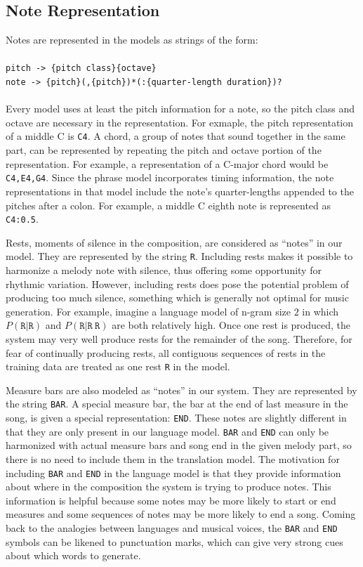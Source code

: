 \documentclass{sig-alternate}
\begin{document}
\subsection{Note Representation}
Notes are represented in the models as strings of the form:\\
\\
\texttt{pitch -> \{pitch class\}\{octave\}}\\
\texttt{note -> \{pitch\}(,\{pitch\})*(:\{quarter-length duration\})?}\\
\\
Every model uses at least the pitch information for a note, so the pitch class and octave are necessary in the representation. For exmaple, the pitch representation of a middle C is \texttt{C4}. A chord, a group of notes that sound together in the same part, can be represented by repeating the pitch and octave portion of the representation. For example, a representation of a C-major chord would be \texttt{C4,E4,G4}. Since the phrase model incorporates timing information, the note representations in that model include the note's quarter-lengths appended to the pitches after a colon. For example, a middle C eighth note is represented as \texttt{C4:0.5}.

Rests, moments of silence in the composition, are considered as ``notes'' in our model. They are represented by the string \texttt{R}. Including rests makes it possible to harmonize a melody note with silence, thus offering some opportunity for rhythmic variation. However, including rests does pose the potential problem of producing too much silence, something which is generally not optimal for music generation. For example, imagine a language model of n-gram size $2$ in which $P(\texttt{R} | \texttt{R})$ and $P (\texttt{R} | \texttt{R}\ \texttt{R})$ are both relatively high. Once one rest is produced, the system may very well produce rests for the remainder of the song. Therefore, for fear of continually producing rests, all contiguous sequences of rests in the training data are treated as one rest \texttt{R} in the model.

Measure bars are also modeled as ``notes'' in our system. They are represented by the string \texttt{BAR}. A special measure bar, the bar at the end of last measure in the song, is given a special representation: \texttt{END}. These notes are slightly different in that they are only present in our language model. \texttt{BAR} and \texttt{END} can only be harmonized with actual measure bars and song end in the given melody part, so there is no need to include them in the translation model. The motivation for including \texttt{BAR} and \texttt{END} in the language model is that they provide information about where in the composition the system is trying to produce notes. This information is helpful because some notes may be more likely to start or end measures and some sequences of notes may be more likely to end a song. Coming back to the analogies between languages and musical voices, the \texttt{BAR} and \texttt{END} symbols can be likened to punctuation marks, which can give very strong cues about which words to generate.
\end{document}
